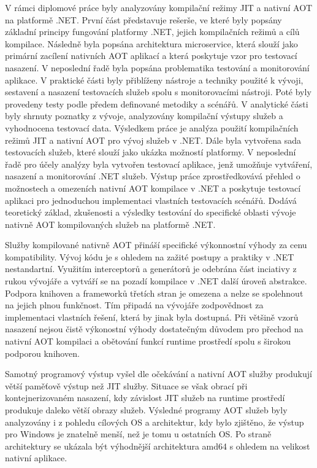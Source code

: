 
V rámci diplomové práce byly analyzovány kompilační režimy JIT a nativní AOT na platformě .NET. První část představuje rešerše, ve které byly popsány základní principy fungování platformy .NET, jejich kompilačních režimů a cílů kompilace. Následně byla popsána architektura microservice, která slouží jako primární zacílení nativních AOT aplikací a která poskytuje vzor pro testovací nasazení. V neposlední řadě byla popsána problematika testování a monitorování aplikace. V praktické části byly přiblíženy nástroje a techniky použité k vývoji, sestavení a nasazení testovacích služeb spolu s monitorovacími nástroji. Poté byly provedeny testy podle předem definované metodiky a scénářů. V analytické části byly shrnuty poznatky z vývoje, analyzovány kompilační výstupy služeb a vyhodnocena testovací data. Výsledkem práce je analýza použití kompilačních režimů JIT a nativní AOT pro vývoj služeb v .NET. Dále byla vytvořena sada testovacích služeb, které slouží jako ukázka možností platformy. V neposlední řadě pro účely analýzy byla vytvořen testovací aplikace, jenž umožňuje vytváření, nasazení a monitorování .NET služeb. Výstup práce zprostředkovává přehled o možnostech a omezeních nativní AOT kompilace v .NET a poskytuje testovací aplikaci pro jednoduchou implementaci vlastních testovacích scénářů. Dodává teoretický základ, zkušenosti a výsledky testování do specifické oblasti vývoje nativně AOT kompilovaných služeb na platformě .NET.

Služby kompilované nativně AOT přináší specifické výkonnostní výhody za cenu kompatibility. Vývoj kódu je s ohledem na zažité postupy a praktiky v .NET nestandartní. Využitím interceptorů a generátorů je odebrána část inciativy z rukou vývojáře a vytváří se na pozadí kompilace v .NET další úroveň abstrakce. Podpora knihoven a frameworků třetích stran je omezena a nelze se spolehnout na jejich plnou funkčnost. Tím připadá na vývojáře zodpovědnost za implementaci vlastních řešení, která by jinak byla dostupná. Při většině vzorů nasazení nejsou čistě výkonostní výhody dostatečným důvodem pro přechod na nativní AOT kompilaci a obětování funkcí runtime prostředí spolu s širokou podporou knihoven.

Samotný programový výstup vyšel dle očekávání a nativní AOT služby produkují větší paměťově výstup než JIT služby. Situace se však obrací při kontejnerizovaném nasazení, kdy závislost JIT služeb na runtime prostředí produkuje daleko větší obrazy služeb. Výsledné programy AOT služeb byly analyzovány i z pohledu cílových OS a architektur, kdy bylo zjištěno, že výstup pro Windows je znatelně menší, než je tomu u ostatních OS. Po straně architektury se ukázala být výhodnější architektura amd64 s ohledem na velikost nativní aplikace.

